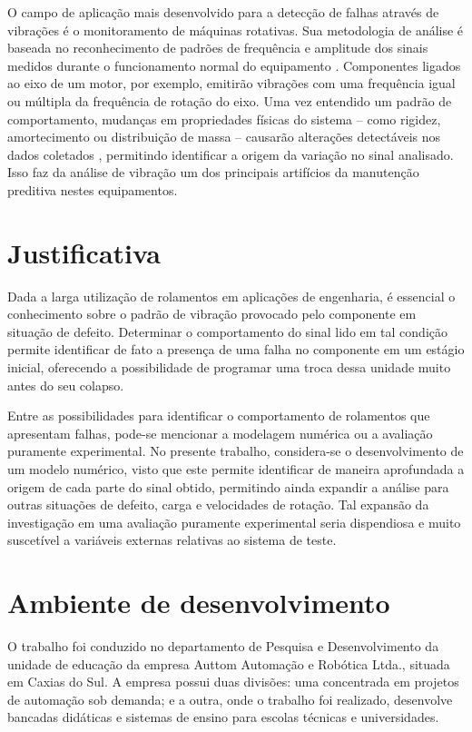 \documentclass[12pt,oneside,english,brazil,lmodern,siglas,simbolos,cite=num]{ucsmonograph}
\begin{document}
	O campo de aplicação mais desenvolvido para a detecção de falhas através de vibrações é o monitoramento de máquinas rotativas.
	Sua metodologia de análise é baseada no reconhecimento de padrões de frequência e amplitude dos sinais medidos durante o funcionamento normal do equipamento \cite{carden:2004}.
	Componentes ligados ao eixo de um motor, por exemplo, emitirão vibrações com uma frequência igual ou múltipla da frequência de rotação do eixo.
	Uma vez entendido um padrão de comportamento, mudanças em propriedades físicas do sistema -- como rigidez, amortecimento ou distribuição de massa -- causarão alterações detectáveis nos dados coletados \cite{qiao:2011}, permitindo identificar a origem da variação no sinal analisado.
	Isso faz da análise de vibração um dos principais artifícios da manutenção preditiva nestes equipamentos.
	
	\section{Justificativa}\label{sec:justificativa}
	Dada a larga utilização de rolamentos em aplicações de engenharia, é essencial o conhecimento sobre o padrão de vibração provocado pelo componente em situação de defeito.
	Determinar o comportamento do sinal lido em tal condição permite identificar de fato a presença de uma falha no componente em um estágio inicial, oferecendo a possibilidade de programar uma troca dessa unidade muito antes do seu colapso.
	
	Entre as possibilidades para identificar o comportamento de rolamentos que apresentam falhas, pode-se mencionar a modelagem numérica ou a avaliação puramente experimental.
	No presente trabalho, considera-se o desenvolvimento de um modelo numérico, visto que este permite identificar de maneira aprofundada a origem de cada parte do sinal obtido, permitindo ainda expandir a análise para outras situações de defeito, carga e velocidades de rotação.
	Tal expansão da investigação em uma avaliação puramente experimental seria dispendiosa e muito suscetível a variáveis externas relativas ao sistema de teste.
	
	\section{Ambiente de desenvolvimento}	
	O trabalho foi conduzido no departamento de Pesquisa e Desenvolvimento da unidade de educação da empresa Auttom Automação e Robótica Ltda., situada em Caxias do Sul.
	A empresa possui duas divisões: uma concentrada em projetos de automação sob demanda; e a outra, onde o trabalho foi realizado, desenvolve bancadas didáticas e sistemas de ensino para escolas técnicas e universidades.
	
\end{document}
